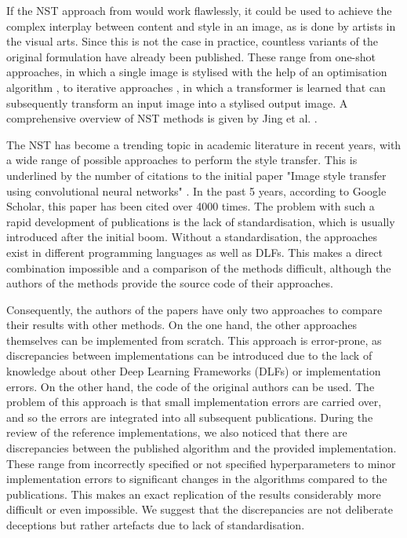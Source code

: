 If the NST approach from \cite{GEB2016} would work flawlessly, it could be used to achieve the complex interplay between content and style in an image, as is done by artists in the visual arts. Since this is not the case in practice, countless variants of the original formulation have already been published. These range from one-shot approaches, in which a single image is stylised with the help of an optimisation algorithm \cite{GEB2016, LW2016, GEB+2017,  ML2019}, to iterative approaches \cite{JAL2016,ULVL2016,UVL2017, SKLO2018}, in which a transformer is learned that can subsequently transform an input image into a stylised output image. A comprehensive overview of NST methods is given by Jing et al. \cite{JYF+2019}.

The NST has become a trending topic in academic literature in recent years, with a wide range of possible approaches to perform the style transfer. This is underlined by the number of citations to the initial paper "Image style transfer using convolutional neural networks" \cite{GEB2016}. In the past 5 years, according to Google Scholar, this paper has been cited over 4000 times. The problem with such a rapid development of publications is the lack of standardisation, which is usually introduced after the initial boom. Without a standardisation, the approaches exist in different programming languages as well as DLFs. This makes a direct combination impossible and a comparison of the methods difficult, although the authors of the methods provide the source code of their approaches.
 
Consequently, the authors of the papers have only two approaches to compare their results with other methods. On the one hand, the other approaches themselves can be implemented from scratch. This approach is error-prone, as discrepancies between implementations can be introduced due to the lack of knowledge about other Deep Learning Frameworks (DLFs) or implementation errors. On the other hand, the code of the original authors can be used. The problem of this approach is that small implementation errors are carried over, and so the errors are integrated into all subsequent publications. During the review of the reference implementations, we also noticed that there are discrepancies between the published algorithm and the provided implementation. These range from incorrectly specified or not specified hyperparameters to minor implementation errors to significant changes in the algorithms compared to the publications. This makes an exact replication of the results considerably more difficult or even impossible. We suggest that the discrepancies are not deliberate deceptions but rather artefacts due to lack of standardisation.


